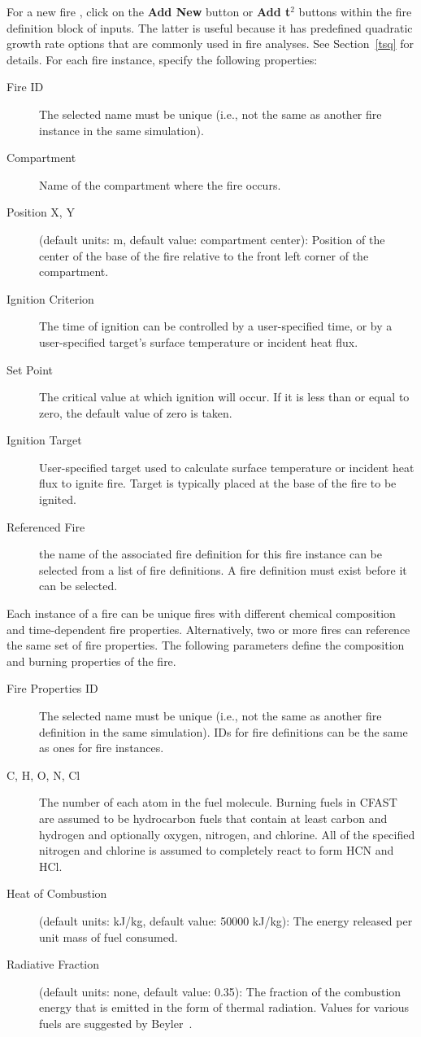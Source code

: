 For a new fire , click on the {\bf Add New} button or {\bf Add t$^2$} buttons within the fire definition block of inputs. The latter is useful because it has predefined quadratic growth rate options that are commonly used in fire analyses. See Section~\ref{tsq} for details. For each fire instance, specify the following properties:
\begin{description}
\item[Fire ID] The selected name must be unique (i.e., not the same as another fire instance in the same simulation).
\item[Compartment] Name of the compartment where the fire occurs.
\item[Position X, Y] (default units: m, default value: compartment center): Position of the center of the base of the fire relative to the front left corner of the compartment.
\item[Ignition Criterion] The time of ignition can be controlled by a user-specified time, or by a user-specified target's surface temperature or incident heat flux.
\item[Set Point] The critical value at which ignition will occur. If it is less than or equal to zero, the default value of zero is taken.
\item[Ignition Target] User-specified target used to calculate surface temperature or incident heat flux to ignite fire. Target is typically placed at the base of the fire to be ignited.
\item[Referenced Fire] the name of the associated fire definition for this fire instance can be selected from a list of fire definitions. A fire definition must exist before it can be selected.
\end{description}

Each instance of a fire can be unique fires with different chemical composition and time-dependent fire properties. Alternatively, two or more fires can reference the same set of fire properties. The following parameters define the composition and burning properties of the fire.
\begin{description}
\item[Fire Properties ID] The selected name must be unique (i.e., not the same as another fire definition in the same simulation). IDs for fire definitions can be the same as ones for fire instances.
\item[C, H, O, N, Cl] The number of each atom in the fuel molecule. Burning fuels in CFAST are assumed to be hydrocarbon fuels that contain at least carbon and hydrogen and optionally oxygen, nitrogen, and chlorine. All of the specified nitrogen and chlorine is assumed to completely react to form HCN and HCl.
\item[Heat of Combustion] (default units: kJ/kg, default value: 50000 kJ/kg): The energy released per unit mass of fuel consumed.
\item[Radiative Fraction] (default units: none, default value: 0.35): The fraction of the combustion energy that is emitted in the form of thermal radiation. Values for various fuels are suggested by Beyler~\cite{Beyler2:SFPE}.
\end{description}



